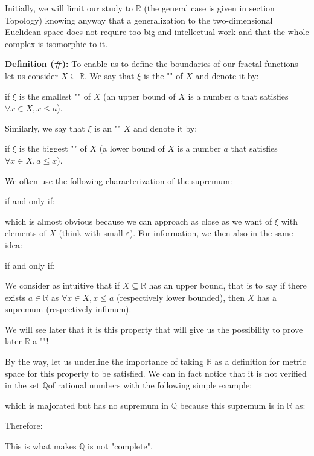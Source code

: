 	Initially, we will limit our study to $\mathbb{R}$ (the general case is given in section Topology) knowing anyway that a generalization to the two-dimensional Euclidean space does not require too big and intellectual work and that the whole complex is isomorphic to it.
	
	\textbf{Definition (\#\mydef):}
	To enable us to define the boundaries of our fractal functions let us consider $X \subseteq \mathbb{R}$. We say that $\xi$ is the "" of $X$ and denote it by:
	
	if $\xi$ is the smallest "" of $X$ (an upper bound of $X$ is a number $a$ that satisfies $\forall x \in X,x\leq a$).
	
	Similarly, we say that $\xi$ is an "" $X$ and denote it by:
	
	if $\xi$ is the biggest "" of $X$ (a lower bound of $X$ is a number $a$ that satisfies $\forall x \in X,a\leq x$).
	
	\begin{tcolorbox}[title=Remark,colframe=black,arc=10pt]
	We often use the following characterization of the supremum:
	
	if and only if:
	
	which is almost obvious because we can approach as close as we want of $\xi$ with elements of $X$ (think with small $\varepsilon$). For information, we then also in the same idea:
	
	if and only if:
	
	\end{tcolorbox}	
	We consider as intuitive that if $X \subseteq \mathbb{R}$ has an upper bound, that is to say if there exists $a \in \mathbb{R}$ as $\forall x \in X,x \leq a$ (respectively lower bounded), then $X$ has a supremum (respectively infimum).
	
	We will see later that it is this property that will give us the possibility to prove later $\mathbb{R}$ a ""!
	\begin{tcolorbox}[title=Remark,colframe=black,arc=10pt]
	By the way, let us underline the importance of taking $\mathbb{R}$ as a definition for metric space for this property to be satisfied. We can in fact notice that it is not verified in the set $\mathbb{Q}$of rational numbers with the following simple example:
	
	which is majorated but has no supremum in $\mathbb{Q}$ because this supremum is in $\mathbb{R}$ as:
	
	Therefore:
	
	This is what makes $\mathbb{Q}$ is not "complete".
	\end{tcolorbox}
	
